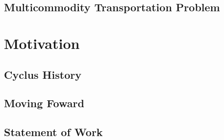 \subsection{Multicommodity Transportation Problem}\label{intro:mtp}

\section{Motivation}

\subsection{Cyclus History}

\subsection{Moving Foward}

\subsection{Statement of Work}
